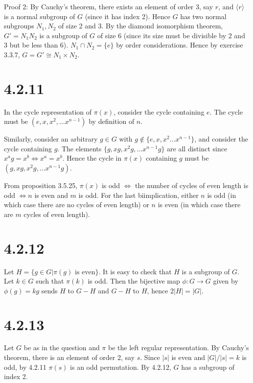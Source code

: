 \documentclass{article}
\def\<{\langle}
\def\>{\rangle}
\begin{document}
Proof 2: By Cauchy's theorem, there exists an element of order 3, say $r$, and $\<r\>$ is a normal subgroup of $G$ (since it has index 2). Hence $G$ has two normal subgroups $N_1, N_2$ of size 2 and 3. By the diamond isomorphism theorem, $G' = N_1 N_2$ is a subgroup of $G$ of size 6 (since its size must be divisible by 2 and 3 but be less than 6). $N_1 \cap N_2 = \{e\}$ by order considerations. Hence by exercise 3.3.7, $G = G' \cong N_1 \times N_2$.

\section*{4.2.11}

In the cycle representation of $\pi(x)$, consider the cycle containing $e$. The cycle must be $(e, x, x^2, \ldots x^{n-1})$ by definition of $n$.

Similarly, consider an arbitrary $g \in G$ with $g \not\in \{e, x, x^2 \ldots x^{n-1}\}$, and consider the cycle containing $g$. The elements $\{g, xg, x^2g, \ldots x^{n-1}g\}$ are all distinct since $x^a g = x^b \iff x^a = x^b$. Hence the cycle in $\pi(x)$ containing $g$ must be $(g, xg, x^2g, \ldots x^{n-1} g)$.

From proposition 3.5.25, $\pi(x)$ is odd $\iff$ the number of cycles of even length is odd $\iff n$ is even and $m$ is odd. For the last biimplication, either $n$ is odd (in which case there are no cycles of even length) or $n$ is even (in which case there are $m$ cycles of even length).

\section*{4.2.12}

Let $H = \{g \in G | \pi(g) \textrm{ is even}\}$. It is easy to check that $H$ is a subgroup of $G$. Let $k \in G$ such that $\pi(k)$ is odd. Then the bijective map $\phi: G \to G$ given by $\phi(g) = kg$ sends $H$ to $G - H$ and $G - H$ to $H$, hence $2|H| = |G|$.

\section*{4.2.13}

Let $G$ be as in the question and $\pi$ be the left regular representation. By Cauchy's theorem, there is an element of order 2, say $s$. Since $|s|$ is even and $|G| / |s| = k$ is odd, by 4.2.11 $\pi(s)$ is an odd permutation. By 4.2.12, $G$ has a subgroup of index 2.
\end{document}
